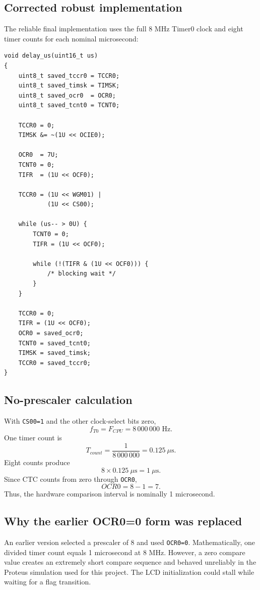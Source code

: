 \documentclass[11pt,a4paper]{article}
\begin{document}
\subsection{Corrected robust implementation}
The reliable final implementation uses the full 8 MHz Timer0 clock and eight timer counts for each nominal microsecond:
\begin{lstlisting}[style=cstyle,caption={Corrected Timer0-based microsecond delay.}]
void delay_us(uint16_t us)
{
    uint8_t saved_tccr0 = TCCR0;
    uint8_t saved_timsk = TIMSK;
    uint8_t saved_ocr0  = OCR0;
    uint8_t saved_tcnt0 = TCNT0;

    TCCR0 = 0;
    TIMSK &= ~(1U << OCIE0);

    OCR0  = 7U;
    TCNT0 = 0;
    TIFR  = (1U << OCF0);

    TCCR0 = (1U << WGM01) |
            (1U << CS00);

    while (us-- > 0U) {
        TCNT0 = 0;
        TIFR = (1U << OCF0);

        while (!(TIFR & (1U << OCF0))) {
            /* blocking wait */
        }
    }

    TCCR0 = 0;
    TIFR = (1U << OCF0);
    OCR0 = saved_ocr0;
    TCNT0 = saved_tcnt0;
    TIMSK = saved_timsk;
    TCCR0 = saved_tccr0;
}
\end{lstlisting}

\subsection{No-prescaler calculation}
With \texttt{CS00=1} and the other clock-select bits zero,
\[
f_{T0}=F_{CPU}=8\,000\,000\text{ Hz}.
\]
One timer count is
\[
T_{count}=\frac{1}{8\,000\,000}=0.125\ \mu\text{s}.
\]
Eight counts produce
\[
8\times0.125\ \mu\text{s}=1\ \mu\text{s}.
\]
Since CTC counts from zero through \texttt{OCR0},
\[
OCR0=8-1=7.
\]
Thus, the hardware comparison interval is nominally 1 microsecond.

\subsection{Why the earlier OCR0=0 form was replaced}
An earlier version selected a prescaler of 8 and used \texttt{OCR0=0}. Mathematically, one divided timer count equals 1 microsecond at 8 MHz. However, a zero compare value creates an extremely short compare sequence and behaved unreliably in the Proteus simulation used for this project. The LCD initialization could stall while waiting for a flag transition.
\end{document}
